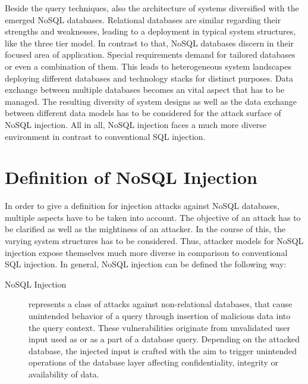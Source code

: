 Beside the query techniques, also the architecture of systems diversified with the emerged NoSQL databases. Relational databases are similar regarding their strengths and weaknesses, leading to a deployment in typical system structures, like the three tier model. In contrast to that, NoSQL databases discern in their focused area of application. Special requirements demand for tailored databases or even a combination of them. This leads to heterogeneous system landscapes deploying different databases and technology stacks for distinct purposes. Data exchange between multiple databases becomes an vital aspect that has to be managed. The resulting diversity of system designs as well as the data exchange between different data models has to be considered for the attack surface of NoSQL injection. All in all, NoSQL injection faces a much more diverse environment in contrast to conventional SQL injection.

\section{Definition of NoSQL Injection}

In order to give a definition for injection attacks against NoSQL databases, multiple aspects have to be taken into account. The objective of an attack has to be clarified as well as the mightiness of an attacker. In the course of this, the varying system structures has to be considered. Thus, attacker models for NoSQL injection expose themselves much more diverse in comparison to conventional SQL injection. In general, NoSQL injection can be defined the following way:\\

\begin{description}
\item [NoSQL Injection] represents a class of attacks against non-relational databases, that cause unintended behavior of a query through insertion of malicious data into the query context. These vulnerabilities originate from unvalidated user input used as or as a part of a database query. Depending on the attacked database, the injected input is crafted with the aim to trigger unintended operations of the database layer affecting confidentiality, integrity or availability of data.
\end{description}

